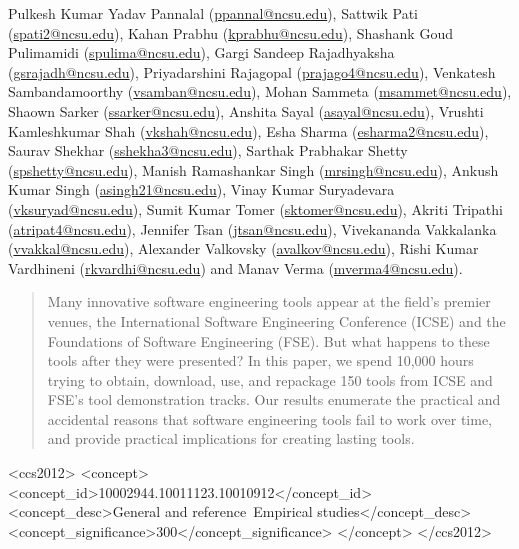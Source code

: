 \documentclass{sig-alternate-05-2015}
\begin{document}
{Pulkesh Kumar Yadav Pannalal (\url{ppannal@ncsu.edu}), 
Sattwik Pati (\url{spati2@ncsu.edu}), 
Kahan Prabhu (\url{kprabhu@ncsu.edu}), 
Shashank Goud Pulimamidi (\url{spulima@ncsu.edu}), 
Gargi Sandeep Rajadhyaksha (\url{gsrajadh@ncsu.edu}), 
Priyadarshini Rajagopal (\url{prajago4@ncsu.edu}), 
Venkatesh Sambandamoorthy (\url{vsamban@ncsu.edu}), 
Mohan Sammeta (\url{msammet@ncsu.edu}), 
Shaown Sarker (\url{ssarker@ncsu.edu}), 
Anshita Sayal (\url{asayal@ncsu.edu}), 
Vrushti Kamleshkumar Shah (\url{vkshah@ncsu.edu}), 
Esha Sharma (\url{esharma2@ncsu.edu}), 
Saurav Shekhar (\url{sshekha3@ncsu.edu}), 
Sarthak Prabhakar Shetty (\url{spshetty@ncsu.edu}), 
Manish Ramashankar Singh (\url{mrsingh@ncsu.edu}), 
Ankush Kumar Singh (\url{asingh21@ncsu.edu}), 
Vinay Kumar Suryadevara (\url{vksuryad@ncsu.edu}), 
Sumit Kumar Tomer (\url{sktomer@ncsu.edu}), 
Akriti Tripathi (\url{atripat4@ncsu.edu}), 
Jennifer Tsan (\url{jtsan@ncsu.edu}), 
Vivekananda Vakkalanka (\url{vvakkal@ncsu.edu}), 
Alexander Valkovsky (\url{avalkov@ncsu.edu}), 
Rishi Kumar Vardhineni (\url{rkvardhi@ncsu.edu}) and
Manav Verma (\url{mverma4@ncsu.edu}).}

\maketitle
\begin{abstract}
Many innovative software engineering tools appear at the field's premier venues, the 
International Software Engineering Conference (ICSE) and the 
Foundations of Software Engineering (FSE).
But what happens to these tools after they were presented?
In this paper, we spend 10,000 hours %
trying to obtain, download, use, and repackage 150 %
tools from ICSE and FSE's tool demonstration tracks.
Our results enumerate the practical and accidental reasons that
software engineering tools fail to work over time,
and provide practical implications for creating lasting tools.
\end{abstract}


%
\begin{CCSXML}
<ccs2012>
<concept>
<concept_id>10002944.10011123.10010912</concept_id>
<concept_desc>General and reference~Empirical studies</concept_desc>
<concept_significance>300</concept_significance>
</concept>
</ccs2012>
\end{CCSXML}

\end{document}
